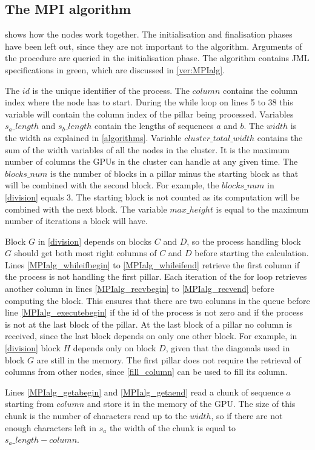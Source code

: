 \subsection{The MPI algorithm}
 shows how the nodes work together.
The initialisation and finalisation phases have been left out, since they are not important to the algorithm.
Arguments of the procedure are queried in the initialisation phase.
The algorithm contains JML specifications in green, which are discussed in \cref{ver:MPIalg}.

The $id$ is the unique identifier of the process.
The $column$ contains the column index where the node has to start. During the while loop on lines 5 to 38 this variable will contain the column index of the pillar being processed.
Variables $s_a\_length$ and $s_b\_length$ contain the lengths of sequences $a$ and $b$.
The $width$ is the width as explained in \cref{algorithms}.
Variable $cluster\_total\_width$ contains the sum of the width variables of all the nodes in the cluster.
It is the maximum number of columns the GPUs in the cluster can handle at any given time.
The $blocks\_num$ is the number of blocks in a pillar minus the starting block as that will be combined with the second block.
For example, the $blocks\_num$ in \cref{division} equals $3$.
The starting block is not counted as its computation will be combined with the next block.
The variable $max\_height$ is equal to the maximum number of iterations a block will have.

Block $G$ in \cref{division} depends on blocks $C$ and $D$, so the process handling block $G$ should get both most right columns of $C$ and $D$ before starting the calculation.
Lines \ref{MPIalg_whileifbegin} to \ref{MPIalg_whileifend} retrieve the first column if the process is not handling the first pillar.
Each iteration of the for loop retrieves another column in lines \ref{MPIalg_recvbegin} to \ref{MPIalg_recvend} before computing the block.
This ensures that there are two columns in the queue before line \ref{MPIalg_executebegin} if the id of the process is not zero and if the process is not at the last block of the pillar.
At the last block of a pillar no column is received, since the last block depends on only one other block.
For example, in \cref{division} block $H$ depends only on block $D$, given that the diagonals used in block $G$ are still in the memory.
The first pillar does not require the retrieval of columns from other nodes, since \cref{fill_column} can be used to fill its column.

Lines \ref{MPIalg_getabegin} and \ref{MPIalg_getaend} read a chunk of sequence $a$ starting from $column$ and store it in the memory of the GPU.
The size of this chunk is the number of characters read up to the $width$, so if there are not enough characters left in $s_a$ the width of the chunk is equal to $s_a\_length - column$.

